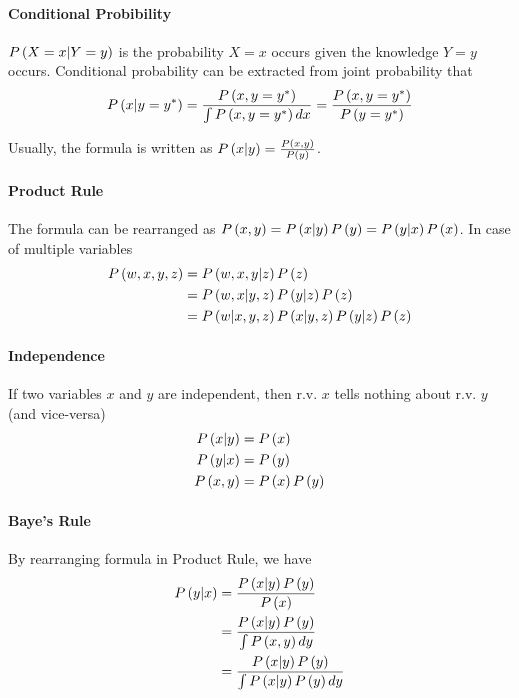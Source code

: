 \paragraph{Conditional Probibility}

$\P{X=x|Y=y}$ is the probability $X=x$ occurs given the knowledge $Y=y$ occurs. Conditional probability can be extracted from joint probability that
\begin{align*}
	\P{x|y=y^{*}}=\frac{\P{x,y=y^{*}}}{\int\P{x,y=y^{*}}dx}=\frac{\P{x,y=y^{*}}}{\P{y=y^{*}}}
\end{align*}

Usually, the formula is written as $\P{x|y}=\frac{\P{x,y}}{\P{y}}$.

\paragraph{Product Rule}

The formula can be rearranged as $\P{x,y}=\P{x|y}\P{y}=\P{y|x}\P{x}$. In case of multiple variables
\begin{align*}
	\P{w,x,y,z}&=\P{w,x,y|z}\P{z} \\
			   &=\P{w,x|y,z}\P{y|z}\P{z} \\
			   &=\P{w|x,y,z}\P{x|y,z}\P{y|z}\P{z}
\end{align*}

\paragraph{Independence}

If two variables $x$ and $y$ are independent, then r.v. $x$ tells nothing about r.v. $y$ (and vice-versa)
\begin{align*}
	\P{x|y}&=\P{x} \\
	\P{y|x}&=\P{y} \\
	\P{x,y}&=\P{x}\P{y}
\end{align*}

\paragraph{Baye's Rule}

By rearranging formula in Product Rule, we have
\begin{align*}
	\P{y|x}&=\frac{\P{x|y}\P{y}}{\P{x}} \\
		   &=\frac{\P{x|y}\P{y}}{\int\P{x,y}dy} \\
		   &=\frac{\P{x|y}\P{y}}{\int\P{x|y}\P{y}dy}
\end{align*}

